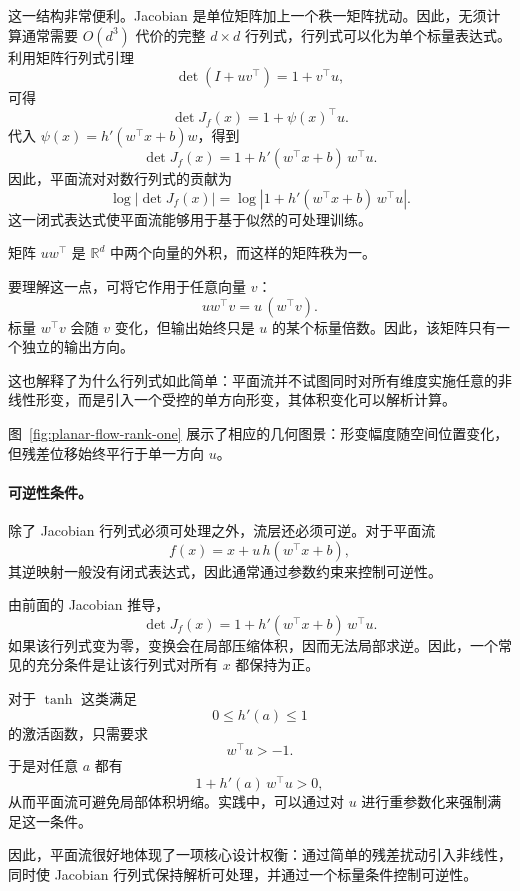 这一结构非常便利。Jacobian 是单位矩阵加上一个秩一矩阵扰动。因此，无须计算通常需要 $O(d^3)$ 代价的完整 $d\times d$ 行列式，行列式可以化为单个标量表达式。利用矩阵行列式引理
\[
\det(I+uv^\top)=1+v^\top u,
\]
可得
\[
\det J_f(x)
=
1+\psi(x)^\top u.
\]
代入 $\psi(x)=h'(w^\top x+b)w$，得到
\[
\boxed{
\det J_f(x)
=
1+h'(w^\top x+b)\,w^\top u.
}
\]
因此，平面流对对数行列式的贡献为
\[
\log|\det J_f(x)|
=
\log\left|
1+h'(w^\top x+b)\,w^\top u
\right|.
\]
这一闭式表达式使平面流能够用于基于似然的可处理训练。

\begin{tcolorbox}[
  colback=blue!4,
  colframe=blue!50!black,
  title={理解秩一更新},
  boxrule=0.6pt,
  arc=2mm,
  left=2mm,
  right=2mm,
  top=1mm,
  bottom=1mm
]
矩阵 $u w^\top$ 是 $\mathbb{R}^d$ 中两个向量的外积，而这样的矩阵秩为一。

要理解这一点，可将它作用于任意向量 $v$：
\[
u w^\top v
=
u\,(w^\top v).
\]
标量 $w^\top v$ 会随 $v$ 变化，但输出始终只是 $u$ 的某个标量倍数。因此，该矩阵只有一个独立的输出方向。

这也解释了为什么行列式如此简单：平面流并不试图同时对所有维度实施任意的非线性形变，而是引入一个受控的单方向形变，其体积变化可以解析计算。
\end{tcolorbox}

图~\ref{fig:planar-flow-rank-one} 展示了相应的几何图景：形变幅度随空间位置变化，但残差位移始终平行于单一方向 $u$。



\paragraph{可逆性条件。}

除了 Jacobian 行列式必须可处理之外，流层还必须可逆。对于平面流
\[
f(x)=x+u\,h(w^\top x+b),
\]
其逆映射一般没有闭式表达式，因此通常通过参数约束来控制可逆性。

由前面的 Jacobian 推导，
\[
\det J_f(x)
=
1+h'(w^\top x+b)\,w^\top u.
\]
如果该行列式变为零，变换会在局部压缩体积，因而无法局部求逆。因此，一个常见的充分条件是让该行列式对所有 $x$ 都保持为正。

对于 $\tanh$ 这类满足
\[
0\leq h'(a)\leq 1
\]
的激活函数，只需要求
\[
w^\top u>-1.
\]
于是对任意 $a$ 都有
\[
1+h'(a)\,w^\top u>0,
\]
从而平面流可避免局部体积坍缩。实践中，可以通过对 $u$ 进行重参数化来强制满足这一条件。

因此，平面流很好地体现了一项核心设计权衡：通过简单的残差扰动引入非线性，同时使 Jacobian 行列式保持解析可处理，并通过一个标量条件控制可逆性。


